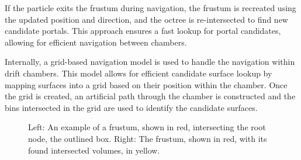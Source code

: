 If the particle exits the frustum during navigation, the frustum is recreated using the updated position and direction, and the octree is re-intersected to find new candidate portals. This approach ensures a fast lookup for portal candidates, allowing for efficient navigation between chambers.

Internally, a grid-based navigation model is used to handle the navigation within drift chambers. This model allows for efficient candidate surface lookup by mapping surfaces into a grid based on their position within the chamber. Once the grid is created, an artificial path through the chamber is constructed and the bins intersected in the grid are used to identify the candidate surfaces.

\begin{figure}[htp]
  \centering
  \hfill
  \caption{Left: An example of a frustum, shown in red, intersecting the root node, the outlined box. Right: The frustum, shown in red, with its found intersected volumes, in yellow.}
  \label{fig:reco_acts_frustum_octree}
\end{figure}
